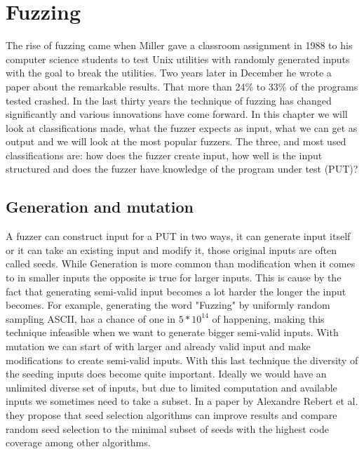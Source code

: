 \chapter{Fuzzing}
\label{cha:2:fuzzing}
The rise of fuzzing came when Miller gave a classroom assignment\cite{21FuzzingAssignment} in 1988 to his computer science students to test Unix utilities with randomly generated inputs with the goal to break the utilities. Two years later in December he wrote a paper\cite{4originalFuzzingUnixUtils} about the remarkable results. That more than 24\% to 33\% of the programs tested crashed.
In the last thirty years the technique of fuzzing has changed significantly and various innovations have come forward. In this chapter we will look at classifications made, what the fuzzer expects as input, what we can get as output and we will look at the most popular fuzzers.
The three\cite{12Fuzzingasurvey},\cite{13manes2019survey} and \cite{30FuzzingHackartandscience} most used classifications are: how does the fuzzer create input, how well is the input structured and does the fuzzer have knowledge of the program under test (PUT)?

\section{Generation and mutation}
A fuzzer can construct input for a PUT in two ways, it can generate input itself or it can take an existing input and modify it, those original inputs are often called seeds. While Generation is more common than modification when it comes to in smaller inputs the opposite is true for larger inputs. This is cause by the fact that generating semi-valid input becomes a lot harder the longer the input becomes. For example, generating the word "Fuzzing" by uniformly random sampling ASCII, has a chance of one in $5*10^{14}$ of happening, making this technique infeasible when we want to generate bigger semi-valid inputs. With mutation we can start of with larger and already valid input and make modifications to create semi-valid inputs. With this last technique the diversity of the seeding inputs does become quite important. Ideally we would have an unlimited diverse set of inputs, but due to limited computation and available inputs we sometimes need to take a subset. In a paper by Alexandre Rebert et al. \cite{14rebert2014seedselecting} they propose that seed selection algorithms can improve results and compare random seed selection to the minimal subset of seeds with the highest code coverage among other algorithms. 

